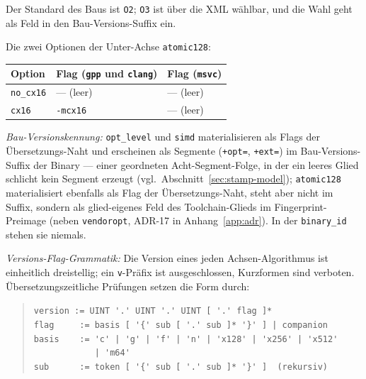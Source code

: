 Der Standard des Baus ist \texttt{O2}; \texttt{O3} ist über die XML wählbar, und die Wahl geht als Feld in den Bau-Versions-Suffix ein.

Die zwei Optionen der Unter-Achse \texttt{atomic128}:

\begin{scriptsize}
\begin{longtable}{@{}>{\raggedright\arraybackslash}p{3.0cm} >{\raggedright\arraybackslash}p{5.2cm} >{\raggedright\arraybackslash}p{5.3cm}@{}}
\toprule
Option & Flag (\texttt{gpp} und \texttt{clang}) & Flag (\texttt{msvc}) \\
\midrule
\endhead%
\texttt{no\_\allowbreak{}cx16} & --- (leer) & --- (leer) \\
\texttt{cx16} & \texttt{-mcx16} & --- (leer) \\
\bottomrule
\end{longtable}
\end{scriptsize}

\emph{Bau-Versionskennung:} \texttt{opt\_\allowbreak{}level} und \texttt{simd} materialisieren als Flags der Übersetzungs-Naht und erscheinen als Segmente (\texttt{+opt=}, \texttt{+ext=}) im Bau-Versions-Suffix der Binary --- einer geordneten Acht-Segment-Folge, in der ein leeres Glied schlicht kein Segment erzeugt (vgl.\ Abschnitt~\ref{sec:stamp-model}); \texttt{atomic128} materialisiert ebenfalls als Flag der Übersetzungs-Naht, steht aber nicht im Suffix, sondern als glied-eigenes Feld des Toolchain-Glieds im Fingerprint-Preimage (neben \texttt{vendoropt}, ADR-17 in Anhang~\ref{app:adr}). In der \texttt{binary\_\allowbreak{}id} stehen sie niemals.

\emph{Versions-Flag-Grammatik:} Die Version eines jeden Achsen-Algorithmus ist einheitlich dreistellig; ein \texttt{v}-Präfix ist ausgeschlossen, Kurzformen sind verboten. Übersetzungszeitliche Prüfungen setzen die Form durch:

\begin{quote}
\verb+version := UINT '.' UINT '.' UINT [ '.' flag ]*+\\
\verb+flag     := basis [ '{' sub [ '.' sub ]* '}' ] | companion+\\
\verb+basis    := 'c' | 'g' | 'f' | 'n' | 'x128' | 'x256' | 'x512'+\\
\verb+            | 'm64'+\\
\verb+sub      := token [ '{' sub [ '.' sub ]* '}' ]  (rekursiv)+
\end{quote}

